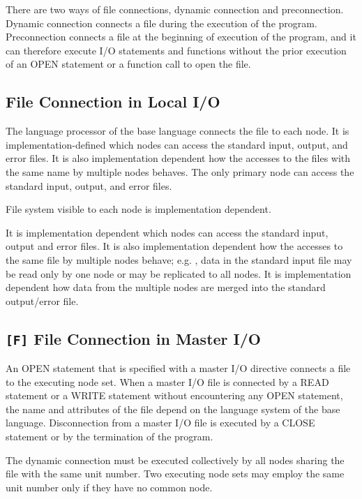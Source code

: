   There are two ways of file connections, dynamic connection and
  preconnection.
  Dynamic connection connects a file during the execution of the program.
  Preconnection connects a file at the beginning of execution of the
  program, and it can therefore execute I/O statements and functions
  without the prior execution of an OPEN statement or a function call to
  open the file.

  \subsection{File Connection in Local I/O}

  The language processor of the base language connects the file to each
  node.
  It is implementation-defined which nodes can access the standard
  input, output, and error files.
  It is also implementation dependent how the accesses to the files with
  the same name by multiple nodes behaves.
  The only primary node can access the standard input, output, and error
  files.
  
  File system visible to each node is implementation dependent.

  It is implementation dependent which nodes can access the standard
  input, output and error files.
  It is also implementation dependent how the accesses to the same file by multiple nodes behave; e.g.
  , data in the standard input file may
  be read only by one node or may be replicated to all nodes.
  It is implementation dependent how data from the multiple nodes are
  merged into the standard output/error file.
  \fi

  \subsection{{\tt [F]} File Connection in Master I/O}

  An OPEN statement that is specified with a master I/O directive connects a
  file to the executing node set.
  When a master I/O file is connected by a READ statement or a WRITE
  statement without encountering any OPEN statement, the name and
  attributes of the file depend on the language system of the base
  language.
  Disconnection from a master I/O file is executed by a CLOSE statement
  or by the termination of the program.

  The dynamic connection must be executed collectively by all nodes sharing
  the file with the same unit number.
  Two executing node sets may employ the same unit number only if they
  have no common node.

